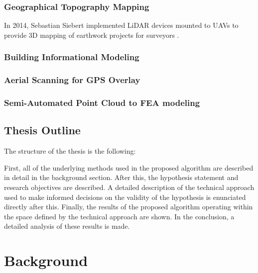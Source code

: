 \documentclass[12pt]{drexelthesis}
\let\Oldsection\section
\renewcommand{\section}{\FloatBarrier\Oldsection}
\let\Oldsubsection\subsection
\renewcommand{\subsection}{\FloatBarrier\Oldsubsection}
\begin{document}
\subsection{Geographical Topography Mapping}
\label{subsec:topographymapping}

In 2014, Sebastian Siebert implemented LiDAR devices mounted to UAVs to provide 3D mapping of earthwork projects for surveyors \cite{RN48}.


\subsection{Building Informational Modeling}
\label{subsec:BIM}

\cite{RN30}
\subsection{Aerial Scanning for GPS Overlay}
\label{subsec:UAVscanning}
\subsection{Semi-Automated Point Cloud to FEA modeling}
\label{subsec:SemiFEA}
\cite{RN29} \cite{RN31} \cite{RN38} \cite{RN54}



\section{Thesis Outline}

The structure of the thesis is the following:

First, all of the underlying methods used in the proposed algorithm are described in detail in the background section. After this, the hypothesis statement and research objectives are described. A detailed description of the technical approach used to make informed decisions on the validity of the hypothesis is enunciated directly after this. Finally, the results of the proposed algorithm operating within the space defined by the technical approach are shown. In the conclusion, a detailed analysis of these results is made.
















\chapter{Background}
\label{chap:background}
\end{document}
